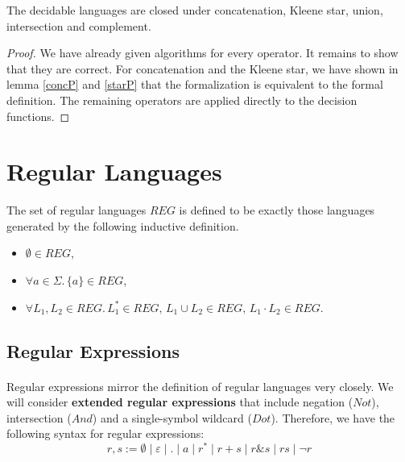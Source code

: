 
    \begin{theorem}{}
        \label{DecLangClosed}
        The decidable languages are closed under concatenation, Kleene star, union, intersection and complement. 
    \end{theorem}
    \begin{proof}
        We have already given algorithms for every operator. 
        It remains to show that they are correct.
        For concatenation and the Kleene star, we have shown in lemma \ref{concP} and \ref{starP} that the formalization is equivalent to the formal definition. 
        The remaining operators are applied directly to the decision functions. 
    \end{proof}

    \paragraph{}


    \section{Regular Languages}


    \begin{definition}{}
        \label{REG}
        The set of regular languages $REG$ is defined to be exactly those languages generated by the following inductive definition.
        \begin{itemize}
            \item
                $\emptyset \in REG$, 
            \item
                $\forall a \in \Sigma. \, \{a\} \in REG$, 
            \item
                $\forall L_1, L_2 \in REG. \, L_1^* \in REG, \, L_1 \cup L_2 \in REG, \, L_1 \cdot L_2 \in REG$.
        \end{itemize}
    \end{definition}


    \subsection{Regular Expressions}

    \paragraph{} 
    Regular expressions mirror the definition of regular languages very closely. 
    We will consider \textbf{extended regular expressions} that include negation ($Not$), intersection ($And$) and a single-symbol wildcard ($Dot$). 
    Therefore, we have the following syntax for regular expressions:
    \begin{equation*}
        r,s := \emptyset \; | \; \varepsilon \; | \; . \; | \; a \; | \; r^* \; | \; r + s \; | \; r \& s \; | \; r s \; | \; \neg r
    \end{equation*}
